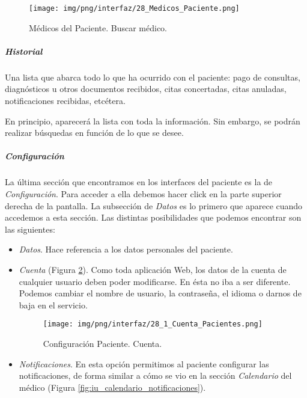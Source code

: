 \documentclass[a4paper,oneside,11pt]{book}
\begin{document}
			\begin{figure}[H]
			  \centering
			    \texttt{[image: img/png/interfaz/28\_Medicos\_Paciente.png]}
			  \caption{Médicos del Paciente. Buscar médico.}
			  \label{fig:iu_medico_paciente_buscar}
			\end{figure}
		
		
		\subparagraph{Historial} %
		\label{par:paciente_historial}
		
		Una lista que abarca todo lo que ha ocurrido con el paciente: pago de consultas, diagnósticos u otros documentos recibidos, citas concertadas, citas anuladas, notificaciones recibidas, etcétera. 
		
		En principio, aparecerá la lista con toda la información. Sin embargo, se podrán realizar búsquedas en función de lo que se desee.		
		
		
		\subparagraph{Configuración} %
		\label{par:paciente_configuracion}
		
			La última sección que encontramos en los interfaces del paciente es la de \textit{Configuración}. Para acceder a ella debemos hacer click en la parte superior derecha de la pantalla. La subsección de \textit{Datos} es lo primero que aparece cuando accedemos a esta sección. Las distintas posibilidades que podemos encontrar son las siguientes:

			\begin{itemize}
				\item \textit{Datos}. Hace referencia a los datos personales del paciente. 
				\item \textit{Cuenta} (Figura \ref{fig:iu_configuracion_cuenta_paciente}). Como toda aplicación Web, los datos de la cuenta de cualquier usuario deben poder modificarse. En ésta no iba a ser diferente. Podemos cambiar el nombre de usuario, la contraseña, el idioma o darnos de baja en el servicio.

				\begin{figure}[H]
				  \centering
				    \texttt{[image: img/png/interfaz/28\_1\_Cuenta\_Pacientes.png]}
				  \caption{Configuración Paciente. Cuenta.}
				  \label{fig:iu_configuracion_cuenta_paciente}
				\end{figure}

				\item \textit{Notificaciones}. En esta opción permitimos al paciente configurar las notificaciones, de forma similar a cómo se vio en la sección \textit{Calendario} del médico (Figura \ref{fig:iu_calendario_notificaciones}). 
			\end{itemize}
		
\end{document}
